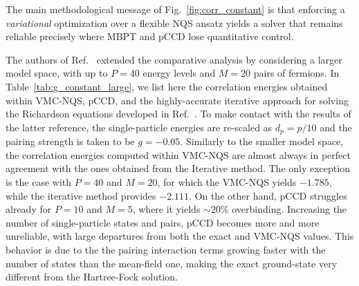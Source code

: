 The main methodological message of Fig.~\ref{fig:corr_constant} is
that enforcing a \emph{variational} optimization over a flexible NQS
ansatz yields a solver that remains reliable precisely where MBPT and
pCCD lose quantitative control.


The authors of Ref.~\cite{rigo2023}  extended the comparative analysis by considering a larger model
space, with up to $P=40$ energy levels and $M=20$ pairs of
fermions. In Table~\ref{tab:g_constant_large}, we list here  the
correlation energies obtained within VMC-NQS, pCCD, and the
highly-accurate iterative approach for solving the Richardson
equations developed in Ref.~\cite{Guan:2022CoPhC}. To make contact
with the results of the latter reference, the single-particle energies
are re-scaled as $d_p = p / 10$ and the pairing strength is taken to
be $g=-0.05$. Similarly to the smaller model space, the correlation
energies computed within VMC-NQS are almost always in perfect
agreement with the ones obtained from the Iterative method. The only
exception is the case with $P=40$ and $M=20$, for which the VMC-NQS
yields $-1.785$, while the iterative method provides $-2.111$.  On
the other hand, pCCD struggles already for $P=10$ and $M=5$, where it
yields $\sim 20\%$ overbinding. Increasing the number of
single-particle states and pairs, pCCD becomes more and more
unreliable, with large departures from both the exact and VMC-NQS
values. This behavior is due to the the pairing interaction terms
growing faster with the number of states than the mean-field one,
making the exact ground-state very different from the Hartree-Fock
solution.

